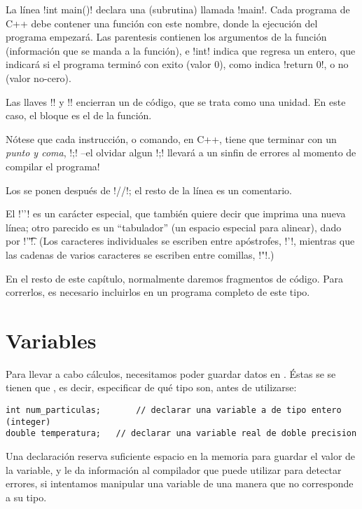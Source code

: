 
La línea \inl!int main()! declara una  (subrutina) llamada
\inl!main!. Cada programa de C++ debe contener una función con este nombre,
donde la ejecución del programa empezará. Las parentesis contienen los
argumentos de la función (información que se manda a
la función), e \inl!int! indica que regresa un entero, que indicará si el
programa terminó con exito (valor $0$), como indica \inl!return 0!, o no (valor
no-cero).

Las llaves \inl!{! y \inl!}! encierran un  de código, que se trata
como una unidad. En este caso, el bloque es el  de la función.

Nótese que cada instrucción, o comando, en C++, tiene que terminar con un
\emph{punto y coma}, \inl!;! --el olvidar algun \inl!;! llevará a un sinfin de
errores al momento de compilar el programa!

Los  se ponen después de \inl!//!; el resto de la línea es un
comentario.

El \inl!'\n'! es un carácter especial, que también quiere decir que imprima una
nueva línea; otro parecido es un ``tabulador'' (un espacio especial para
alinear), dado por \inl!'\t'!.  (Los caracteres individuales se escriben entre
apóstrofes, \inl!'!, mientras que las cadenas de varios caracteres se escriben
entre comillas, \inl!"!.)

En el resto de este capítulo, normalmente daremos fragmentos de código. Para
correrlos, es necesario incluirlos en un programa completo de este tipo.

\section{Variables}
Para llevar a cabo cálculos, necesitamos poder guardar datos en
. Éstas se se tienen que , es
decir, especificar de qué tipo son, 
antes de utilizarse:

\begin{lstlisting}
int num_particulas;   	  // declarar una variable a de tipo entero (integer)
double temperatura;   // declarar una variable real de doble precision
\end{lstlisting}

Una declaración  reserva suficiente espacio en la memoria
para guardar el valor de la variable, y le da información al compilador
que puede utilizar para detectar errores, si intentamos manipular una variable
de una manera que no corresponde a su tipo.

